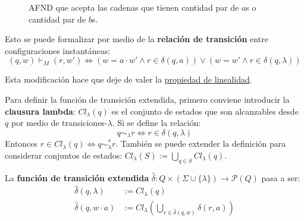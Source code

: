 \begin{figure}[H]
    \centering
    \caption*{AFND que acepta las cadenas que tienen cantidad par de $a$s o cantidad par de $b$s.}
\end{figure}

Esto se puede formalizar por medio de la \textbf{relación de transición} entre configuraciones instantáneas:
$$
(q, w) \vdash_M (r, w') \iff (w = a \cdot w' \land r \in \delta(q, a)) \lor (w = w' \land r \in \delta(q, \lambda))
$$

Esta modificación hace que deje de valer la \hyperref[subsubsec-propiedades-rel-transicion]{propiedad de linealidad}.

Para definir la función de transición extendida, primero conviene introducir la \textbf{clausura lambda}: $Cl_\lambda(q)$ es el conjunto de estados que son alcanzables desde $q$ por medio de transiciones-$\lambda$. Si se define la relación:
$$q \sim_\lambda r \iff r \in \delta(q, \lambda)$$
Entonces $r \in Cl_\lambda(q) \iff q \sim_\lambda^* r$. También se puede extender la definición para considerar conjuntos de estados: $Cl_\lambda(S) := \bigcup_{q \in S} Cl_\lambda(q)$.

La \textbf{función de transición extendida} $\hat \delta : Q \times (\Sigma \cup \{\lambda\}) \to \mathcal P (Q)$ pasa a ser:
$$
\begin{aligned}
    \hat \delta (q, \lambda) & := Cl_\lambda(q) \\
    \hat \delta (q, w \cdot a) & := Cl_\lambda\left(\bigcup_{r \in \hat \delta(q, w)} \delta(r, a) \right)
\end{aligned}
$$

